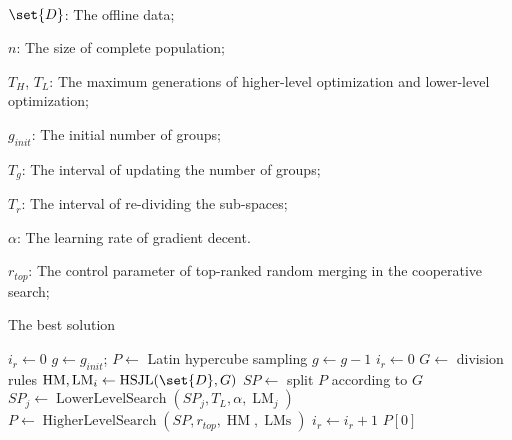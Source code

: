 \begin{algorithmic}[1]
\REQUIRE~\\
    $\set{D}$: The offline data;

    
    $n$: The size of complete population;

    $T_H$, $T_L$: The maximum generations of higher-level optimization and lower-level optimization;

    $g_{init}$: The initial number of groups; 
    
     
    $T_g$: The interval of updating the number of groups; 
    
    $T_r$: The interval of re-dividing the sub-spaces;

    $\alpha$: The learning rate of gradient decent.
    
    $r_{top}$: The control parameter of top-ranked random merging in the cooperative search; %

    
    \ENSURE The best solution
    
    \STATE $i_{r} \leftarrow 0$ 
    \STATE $g \leftarrow g_{init} $;%
    \STATE $P \leftarrow $ Latin hypercube sampling
            \STATE $g \leftarrow g - 1$
            \STATE $i_r \leftarrow 0$
        \ENDIF
            \STATE $G \leftarrow $ division rules
            \STATE $\operatorname{HM}, \operatorname{LM}_i \leftarrow \operatorname{HSJL}(\set{D}, G)$
        \ENDIF
        \STATE $SP \leftarrow$ split $P$ according to $G$
            \STATE $SP_j \leftarrow \operatorname{LowerLevelSearch}(SP_j, T_L, \alpha, \operatorname{LM}_j)$
        \ENDFOR
            \STATE $P \leftarrow \operatorname{HigherLevelSearch}(SP, r_{top}, %
            \operatorname{HM},\operatorname{LMs})$
        \ENDIF
        \STATE $i_r \leftarrow i_r + 1$
    \ENDFOR
\RETURN $P[0]$
\end{algorithmic}